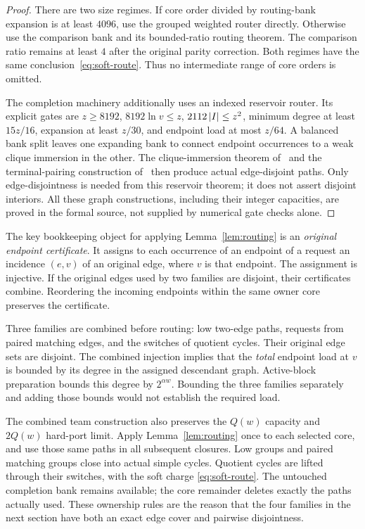 \begin{proof}
There are two size regimes. If core order divided by routing-bank expansion
is at least $4096$, use the grouped weighted router directly. Otherwise
use the comparison bank and its bounded-ratio routing theorem. The
comparison ratio remains at least $4$ after the original parity correction.
Both regimes have the same conclusion~\eqref{eq:soft-route}. Thus no
intermediate range of core orders is omitted.

The completion machinery additionally uses an indexed reservoir router.
Its explicit gates are $z\ge8192$, $8192\ln v\le z$,
$2112\left|I\right|\le z^2$, minimum degree at least $15z/16$, expansion at least
$z/30$, and endpoint load at most $z/64$. A balanced bank split leaves
one expanding bank to connect endpoint occurrences to a weak clique
immersion in the other. The clique-immersion theorem of~\cite{GLW2019}
and the terminal-pairing construction of~\cite{GMM2018}
then produce actual edge-disjoint paths. Only edge-disjointness is needed
from this reservoir theorem; it does not assert disjoint interiors.
All these graph constructions, including their integer capacities, are
proved in the formal source, not supplied by numerical gate checks alone.
\end{proof}

The key bookkeeping object for applying Lemma~\ref{lem:routing} is an
\emph{original endpoint certificate}. It assigns to each occurrence of
an endpoint of a request an incidence $(e,v)$ of an original edge, where
$v$ is that endpoint. The assignment is injective. If the original edges
used by two families are disjoint, their certificates combine. Reordering
the incoming endpoints within the same owner core preserves the certificate.

Three families are combined before routing: low two-edge paths, requests
from paired matching edges, and the switches of quotient cycles. Their
original edge sets are disjoint. The combined injection implies that the
\emph{total} endpoint load at $v$ is bounded by its degree in the assigned
descendant graph. Active-block preparation bounds this degree by
$2^{\alpha w}$. Bounding the three families separately and adding those
bounds would not establish the required load.

The combined team construction also preserves the $Q(w)$ capacity and
$2Q(w)$ hard-port limit. Apply Lemma~\ref{lem:routing} once to each selected
core, and use those same paths in all subsequent closures. Low groups and
paired matching groups close into actual simple cycles. Quotient cycles
are lifted through their switches, with the soft charge
\eqref{eq:soft-route}. The untouched completion bank remains available;
the core remainder deletes exactly the paths actually used. These ownership
rules are the reason that the four families in the next section have both
an exact edge cover and pairwise disjointness.
